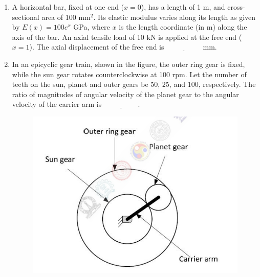 \documentclass[journal]{IEEEtran}
\begin{document}
\begin{enumerate}[leftmargin=0pt]
    \item A horizontal bar, fixed at one end ($x=0$), has a length of 1 m, and cross-sectional area of 100 mm$^2$. Its elastic modulus varies along its length as given by $E(x) = 100 e^x$ GPa, where $x$ is the length coordinate (in m) along the axis of the bar. An axial tensile load of 10 kN is applied at the free end ($x=1$). The axial displacement of the free end is $\underline{\hspace{2cm}}$ mm.
    \hfill{}

    \item In an epicyclic gear train, shown in the figure, the outer ring gear is fixed, while the sun gear rotates counterclockwise at 100 rpm. Let the number of teeth on the sun, planet and outer gears be 50, 25, and 100, respectively. The ratio of magnitudes of angular velocity of the planet gear to the angular velocity of the carrier arm is $\underline{\hspace{2cm}}$.
    \hfill{}
    \begin{figure}[h]
    \centering
    \includegraphics[width=0.5\columnwidth]{Figs/image (28).png}
    \caption*{}
    \label{fig:45}
    \end{figure}


\end{enumerate}
\end{document}
